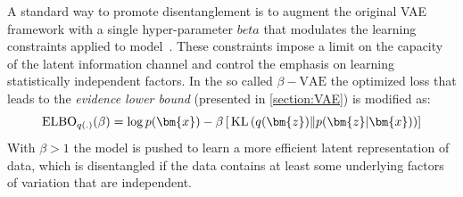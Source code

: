 %
A standard way to promote disentanglement is to augment the original \acs{VAE} framework with a single hyper-parameter $beta$ that modulates the learning constraints applied to model~\cite{Higgins2017betaVAELB}. These constraints impose a limit on the capacity of the latent information channel and control the emphasis on learning statistically independent factors. 
In the so called $\beta-\textrm{VAE}$ the optimized loss that leads to the \textit{evidence lower bound} (presented in \cref{section:VAE}) is modified as:
\begin{equation}
    \mathrm{ELBO}_{q(.)}(\beta) = \log p(\bm{x}) - \beta \left[ \KLD{q(\bm{z})}{p(\bm{z}|\bm{x})} \right]
\end{equation}
With $\beta>1$ the model is pushed to learn a more efficient latent representation of data, which is disentangled if the data contains at least some underlying factors of variation that are independent.
%
